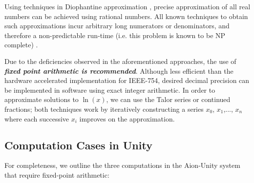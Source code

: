 Using techniques in Diophantine approximation \cite{Sch96, Cur19}, precise approximation of all real numbers can be achieved using rational numbers. All known techniques to obtain such approximations incur arbitrary long numerators or denominators, and therefore a non-predictable run-time (i.e. this problem is known to be NP complete) \cite{ER09}.

Due to the deficiencies observed in the aforementioned approaches, the use of \textbf{\textit{fixed point arithmetic is recommended}}. Although less efficient than the hardware accelerated implementation for IEEE-754, desired decimal precision can be implemented in software using exact integer arithmetic. In order to approximate solutions to $\ln(x)$, we can use the Talor series or continued fractions; both techniques work by iteratively constructing a series $x_0$, $x_1$,..., $x_n$ where each successive $x_i$ improves on the approximation. 

\subsection{Computation Cases in Unity}
For completeness, we outline the three computations in the Aion-Unity system that require fixed-point arithmetic: 

